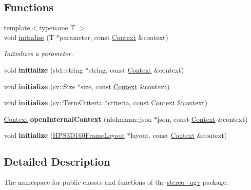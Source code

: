 \subsection*{Functions}
\begin{DoxyCompactItemize}
\item 
{\footnotesize template$<$typename T $>$ }\\void \hyperlink{namespacestereo__ugv_a6971cc11001fdf589a71f6fb3099c65b}{initialize} (T $\ast$parameter, const \hyperlink{classstereo__ugv_1_1Context}{Context} \&context)
\begin{DoxyCompactList}\small\item\em Initializes a parameter. \end{DoxyCompactList}\item 
\mbox{\label{namespacestereo__ugv_aaa158ec1ee9178414843adbbb91a394b}} 
void {\bfseries initialize} (std\+::string $\ast$string, const \hyperlink{classstereo__ugv_1_1Context}{Context} \&context)
\item 
\mbox{\label{namespacestereo__ugv_adab204dc6f43824bcda4cd5e172d2812}} 
void {\bfseries initialize} (cv\+::\+Size $\ast$size, const \hyperlink{classstereo__ugv_1_1Context}{Context} \&context)
\item 
\mbox{\label{namespacestereo__ugv_a0a98148c84d1f085ac51c2f2fb7c8e7a}} 
void {\bfseries initialize} (cv\+::\+Term\+Criteria $\ast$criteria, const \hyperlink{classstereo__ugv_1_1Context}{Context} \&context)
\item 
\mbox{\label{namespacestereo__ugv_aef8f9a951e11f9d5d178db99754aac4b}} 
\hyperlink{classstereo__ugv_1_1Context}{Context} {\bfseries open\+Internal\+Context} (nlohmann\+::json $\ast$json, const \hyperlink{classstereo__ugv_1_1Context}{Context} \&context)
\item 
\mbox{\label{namespacestereo__ugv_ac02cc03581ba53b911a9a7bd87f9a24c}} 
void {\bfseries initialize} (\hyperlink{classstereo__ugv_1_1HPS3D160FrameLayout}{H\+P\+S3\+D160\+Frame\+Layout} $\ast$layout, const \hyperlink{classstereo__ugv_1_1Context}{Context} \&context)
\end{DoxyCompactItemize}


\subsection{Detailed Description}
The namespace for public classes and functions of the \hyperlink{namespacestereo__ugv}{stereo\+\_\+ugv} package. 

